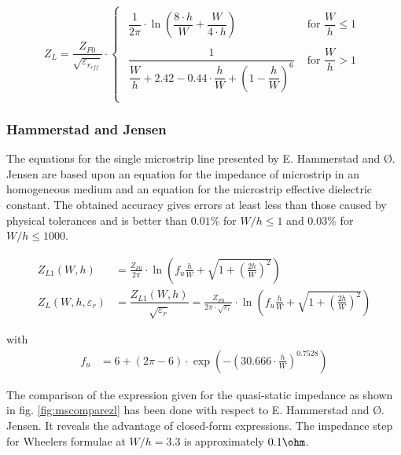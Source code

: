 \begin{equation}
Z_L = \dfrac{Z_{F0}}{\sqrt{\varepsilon_{r_{eff}}}}\cdot
\begin{cases}
\begin{array}{ll}
\dfrac{1}{2\pi}\cdot \ln{\left(\dfrac{8\cdot h}{W} + \dfrac{W}{4\cdot h}\right)} & \textrm{ for } \dfrac{W}{h} \le 1\\
&\\
\dfrac{1}{\dfrac{W}{h} + 2.42 - 0.44\cdot\dfrac{h}{W} + \left(1 - \dfrac{h}{W}\right)^6} & \textrm{ for } \dfrac{W}{h} > 1\\
\end{array}
\end{cases}
\end{equation}

\subsubsection{Hammerstad and Jensen}

The equations for the single microstrip line presented by
E. Hammerstad and {\O}. Jensen \cite{Hammerstad} are based upon an
equation for the impedance of microstrip in an homogeneous medium and
an equation for the microstrip effective dielectric constant.  The
obtained accuracy gives errors at least less than those caused by
physical tolerances and is better than $0.01\%$ for $W/h \le 1$ and
$0.03\%$ for $W/h \le 1000$.

\begin{align}
\label{eq:HandJZL0}
Z_{L1}\left(W, h\right) &=
\frac{Z_{F0}}{2\pi}\cdot\ln{\left(f_{u}\frac{h}{W} + \sqrt{1 + \left(\frac{2h}{W}\right)^{2}}\right)}\\
\label{eq:HandJZL0Er}
Z_{L}\left(W, h, \varepsilon_{r}\right) &= \dfrac{Z_{L1} \left(W, h\right)}{\sqrt{\varepsilon_{r}}} = \frac{Z_{F0}}{2\pi\cdot\sqrt{\varepsilon_{r}}}\cdot\ln{\left(f_{u}\frac{h}{W} + \sqrt{1 + \left(\frac{2h}{W}\right)^{2}}\right)}
\end{align}

with
\begin{align}
f_{u} &= 6 + \left(2\pi - 6\right)\cdot\exp{\left(-\left(30.666\cdot\frac{h}{W}\right)^{0.7528}\right)}
\end{align}

The comparison of the expression given for the quasi-static impedance
as shown in fig. \ref{fig:mscomparezl} has been done with respect to
E. Hammerstad and {\O}. Jensen.  It reveals the advantage of closed-form
expressions.  The impedance step for Wheelers formulae at $W/h = 3.3$
is approximately $0.1\ohm$.

